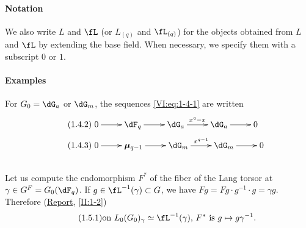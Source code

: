 \documentclass[oneside]{book}
\newcommand{\dmu}{{\bm\mu}}
\theoremstyle{sga-source}
\theoremstyle{sga-source-dash}
\theoremstyle{sga-source-dotdash}
\theoremstyle{sga-source-number-note-dash}
\theoremstyle{sga-source-note-number-dotdash}
\theoremstyle{sga-source-example-dotdash}
\theoremstyle{sga-source-inline-number}
\theoremstyle{sga-source-bare-number}
\theoremstyle{sga-source}
\newcommand{\PrintPage}[1]{}\newcommand{\MathPage}[1]{}\newcommand{\PrintCite}[2]{#1}\newcommand{\var}[3]{#1}
\begin{document}
\paragraph{Notation}
We also write $L$ and $\fL$ (or $L_{(q)}$ and $\fL_{(q)}$) for the objects obtained 
from $L$ and $\fL$ by extending the base field. When necessary, we 
specify them with a subscript $0$ or $1$.


\PrintPage{172}
\paragraph{Examples}
For $G_0=\dG_a$ or $\dG_m$, the sequences \eqref{VI:eq:1-4-1} are written 
\begin{align*}\tag{1.4.2}\label{VI:eq:1-4-2}
&\xymatrix{
  0 \ar[r] 
    & \dF_q \ar[r] 
    & \dG_a \ar[r]^-{x^q-x} 
    & \dG_a \ar[r] 
    & 0 
} \\
\tag{1.4.3}\label{VI:eq:1-4-3}
&\xymatrix{
  0 \ar[r] 
    & \dmu_{q-1} \ar[r] 
    & \dG_m \ar[r]^-{x^{q-1}} 
    & \dG_m \ar[r] 
    & 0
}
\end{align*}





\subsection{}\label{VI:1-5}

Let us compute the endomorphism $F^\ast$ of the fiber of the Lang torsor at 
$\gamma\in G^F=G_0(\dF_q)$. If $g\in \fL^{-1}(\gamma)\subset G$, we have 
$F g = F g\cdot g^{-1}\cdot g = \gamma g$. Therefore (\hyperref[II]{Report}, 
\ref{II:1-2}) 
\begin{equation*}\tag{1.5.1}\label{VI:eq:1-5-1}
  \text{on $L_0(G_0)_\gamma\simeq \fL^{-1}(\gamma)$, $F^\ast$ is $g\mapsto g\gamma^{-1}$.}
\end{equation*}





\subsection{}\label{VI:1-6}
\end{document}
